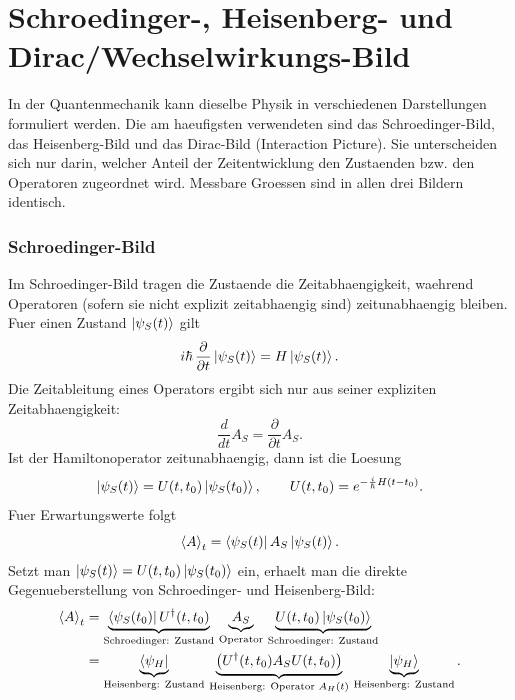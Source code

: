 \section{Schroedinger-, Heisenberg- und Dirac/Wechselwirkungs-Bild }

In der Quantenmechanik kann dieselbe Physik in
verschiedenen Darstellungen formuliert werden.
Die am haeufigsten verwendeten sind das
Schroedinger-Bild, das Heisenberg-Bild und das
Dirac-Bild (Interaction Picture). Sie
unterscheiden sich nur darin, welcher Anteil der
Zeitentwicklung den Zustaenden bzw. den
Operatoren zugeordnet wird. Messbare Groessen
sind in allen drei Bildern identisch.

\subsubsection*{Schroedinger-Bild}

Im Schroedinger-Bild tragen die Zustaende die
Zeitabhaengigkeit, waehrend Operatoren (sofern
sie nicht explizit zeitabhaengig sind)
zeitunabhaengig bleiben. Fuer einen Zustand
$\left|\psi_S(t)\right\rangle$ gilt
\begin{equation}
  i\hbar\,\frac{\partial}{\partial t}\left|\psi_S(t)\right\rangle=H\left|\psi_S(t)\right\rangle.
\end{equation}
Die Zeitableitung eines Operators ergibt sich nur aus seiner expliziten Zeitabhaengigkeit:
\begin{equation}
  \frac{d}{dt}A_S=\frac{\partial}{\partial t}A_S.
\end{equation}
Ist der Hamiltonoperator zeitunabhaengig, dann ist die Loesung
\begin{equation}
  \left|\psi_S(t)\right\rangle=U(t,t_0)\left|\psi_S(t_0)\right\rangle,
  \qquad
  U(t,t_0)=e^{-\frac{i}{\hbar}H(t-t_0)}.
\end{equation}
Fuer Erwartungswerte folgt
\begin{equation}
  \left\langle A\right\rangle_t=\left\langle\psi_S(t)\right|A_S\left|\psi_S(t)\right\rangle.
\end{equation}
Setzt man $\left|\psi_S(t)\right\rangle=U(t,t_0)\left|\psi_S(t_0)\right\rangle$ ein, erhaelt man die direkte Gegenueberstellung von Schroedinger- und Heisenberg-Bild:
\begin{equation}
  \begin{aligned}
    \left\langle A\right\rangle_t
     & = \underbrace{\left\langle\psi_S(t_0)\right|U^{\dagger}(t,t_0)}_{\text{Schroedinger: Zustand}}
    \,\underbrace{A_S}_{\text{Operator}}\,
    \underbrace{U(t,t_0)\left|\psi_S(t_0)\right\rangle}_{\text{Schroedinger: Zustand}}                \\
     & = \underbrace{\left\langle\psi_H\right|}_{\text{Heisenberg: Zustand}}
    \,\underbrace{\bigl(U^{\dagger}(t,t_0)A_SU(t,t_0)\bigr)}_{\text{Heisenberg: Operator }A_H(t)}\,
    \underbrace{\left|\psi_H\right\rangle}_{\text{Heisenberg: Zustand}}.
  \end{aligned}
\end{equation}

